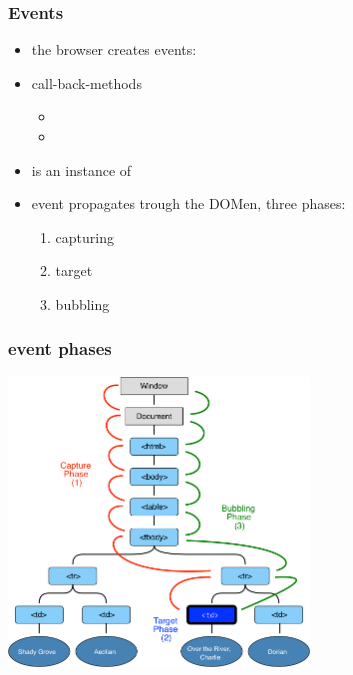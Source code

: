 \begin{frame}[fragile]
\frametitle{Events}
\color{structure}

\begin{itemize}\color{structure}
\item the browser creates events: 
\item call-back-methods
\begin{itemize}
  \item {}
  \item {}
\end{itemize}
\item {} is an instance of 
\item event propagates trough the DOMen, three phases:
  \begin{enumerate}
    \item capturing
    \item target
    \item bubbling
  \end{enumerate}
\end{itemize}

\end{frame}

\begin{frame}[fragile]
\frametitle{event phases}
\color{structure}
  \centering
  \includegraphics[width=8cm]{img/eventflow}

\end{frame}

